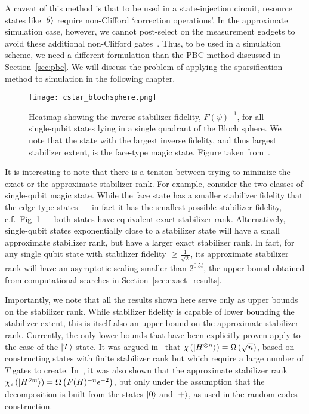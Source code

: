A caveat of this method is that to be used in a state-injection circuit, resource states like $\ket{\theta}$ require non-Clifford `correction operations'. In the approximate simulation case, however, we cannot post-select on the measurement gadgets to avoid these additional non-Clifford gates~\cite{Bravyi2016}. Thus, to be used in a simulation scheme, we need a different formulation than the PBC method discussed in Section~\ref{sec:pbc}. We will discuss the problem of applying the sparsification method to simulation in the following chapter.\par
\begin{figure}[H]
\centering
\texttt{[image: cstar\_blochsphere.png]}
\caption{Heatmap showing the inverse stabilizer fidelity, $F(\psi)^{-1}$, for all single-qubit states lying in a single quadrant of the Bloch sphere. We note that the state with the largest inverse fidelity, and thus largest stabilizer extent, is the face-type magic state. Figure taken from~\cite{Bravyi2018}.}
\label{fig:fidelity_heatmap}
\end{figure}
It is interesting to note that there is a tension between trying to minimize the exact or the approximate stabilizer rank. For example, consider the two classes of single-qubit magic state. While the face state has a smaller stabilizer fidelity that the edge-type states ---  in fact it has the smallest possible stabilizer fidelity, c.f.\ Fig~\ref{fig:fidelity_heatmap} --- both states have equivalent exact stabilizer rank. Alternatively, single-qubit states exponentially close to a stabilizer state will have a small approximate stabilizer rank, but have a larger exact stabilizer rank. In fact, for any single qubit state with stabilizer fidelity $\geq\frac{1}{\sqrt{2}}$, its approximate stabilizer rank will have an asymptotic scaling smaller than $2^{0.5t}$, the upper bound obtained from computational searches in Section~\ref{sec:exact_results}.\par
Importantly, we note that all the results shown here serve only as upper bounds on the stabilizer rank. While stabilizer fidelity is capable of lower bounding the stabilizer extent, this is itself also an upper bound on the approximate stabilizer rank. Currently, the only lower bounds that have been explicitly proven apply to the case of the $\ket{T}$ state. It was argued in~\cite{Bravyi2015} that $\chi\left(\ket{H^{\otimes n}}\right)=\Omega\left(\sqrt{n}\right)$, based on constructing states with finite stabilizer rank but which require a large number of $T$ gates to create. In~\cite{Bravyi2018}, it was also shown that the approximate stabilizer rank $\chi_{\epsilon}\left(\ket{H^{\otimes n}}\right)=\Omega\left(F(H)^{-n}\epsilon^{-2}\right)$, but only under the assumption that the decomposition is built from the states $\ket{0}$ and $\ket{+}$, as used in the random codes construction.\par
